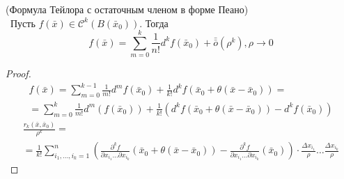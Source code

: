 \begin{theorem}(Формула Тейлора с остаточным членом в форме Пеано)\\\
    Пусть $f(\bar{x})\in \mathcal{C}^k(B(\bar{x}_0))$. Тогда
    \[f(\bar{x})=\sum\limits_{m=0}^{k}\frac{1}{n!}d^k f(\bar{x}_0)+\bar{\bar{o}}{(\rho^k)}, \rho\to 0\] 
\end{theorem} 
\begin{proof}
    \begin{multline*}
        f(\bar{x})=\sum\limits_{m=0}^{k-1}\frac{1}{m!} d^m f(\bar{x}_0)+\frac{1}{k!}d^k f(\bar{x}_0+\theta(\bar{x}-\bar{x}_0))=\\
        =\sum\limits_{m=0}^{k} \frac{1}{m!} d^m(f(\bar{x}_0))+\frac{1}{k!}(d^kf(\bar{x}_0+\theta(\bar{x}-\bar{x}_0))-d^k f(\bar{x}_0))
    \end{multline*}
    \begin{multline*}
        \frac{r_k(\bar{x},\bar{x}_0)}{\rho^k}=\\=\frac{1}{k!}\sum\limits_{i_1,\dots, i_k=1}^{n}\left(\frac{\partial^k {f}}{\partial {x_{i_1}}\dots \partial x_{i_k}}(\bar{x}_0+\theta (\bar{x}-\bar{x}_0))-\frac{\partial^k {f}}{\partial {x_{i_1}}\dots \partial x_{i_k}}(\bar{x}_0)\right)\cdot \frac{\Delta x_{i_1}}{\rho}\dots \frac{\Delta x_{i_k}}{\rho}
    \end{multline*}
\end{proof} 
